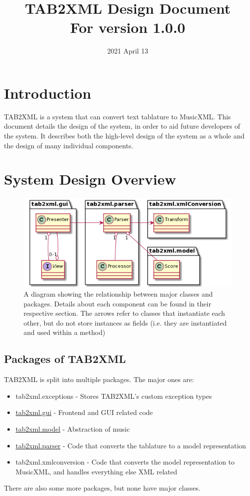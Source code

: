 \documentclass[11pt]{article}
\date{2021 April 13}
\title{TAB2XML Design Document\\\medskip
\large For version 1.0.0}
\begin{document}
\maketitle
\tableofcontents

\newpage

\section{Introduction}
\label{sec:org476fe8f}
TAB2XML is a system that can convert text tablature to MusicXML.  This document details the design of the system, in order to aid future developers of the system.  It describes both the high-level design of the system as a whole and the design of many individual components.
\section{System Design Overview}
\label{sec:org4c33d72}
\begin{figure}[htbp]
\centering
\includegraphics[width=.9\linewidth]{./Diagrams/full-system-diagram.png}
\caption{A diagram showing the relationship between major classes and packages.  Details about each component can be found in their respective section.  The arrows refer to classes that instantiate each other, but do not store instances as fields (i.e. they are instantiated and used within a method)}
\end{figure}

\subsection{Packages of TAB2XML}
\label{sec:org0085ad0}
TAB2XML is split into multiple packages.  The major ones are:
\begin{itemize}
\item tab2xml.exceptions - Stores TAB2XML's custom exception types
\item \hyperref[sec:org740eb80]{tab2xml.gui} - Frontend and GUI related code
\item \hyperref[sec:org94f1f18]{tab2xml.model} - Abstraction of music
\item \hyperref[sec:org9cb87c0]{tab2xml.parser} - Code that converts the tablature to a model representation
\item tab2xml.xmlconversion - Code that converts the model representation to MusicXML, and handles everything else XML related
\end{itemize}
There are also some more packages, but none have major classes.
\end{document}
